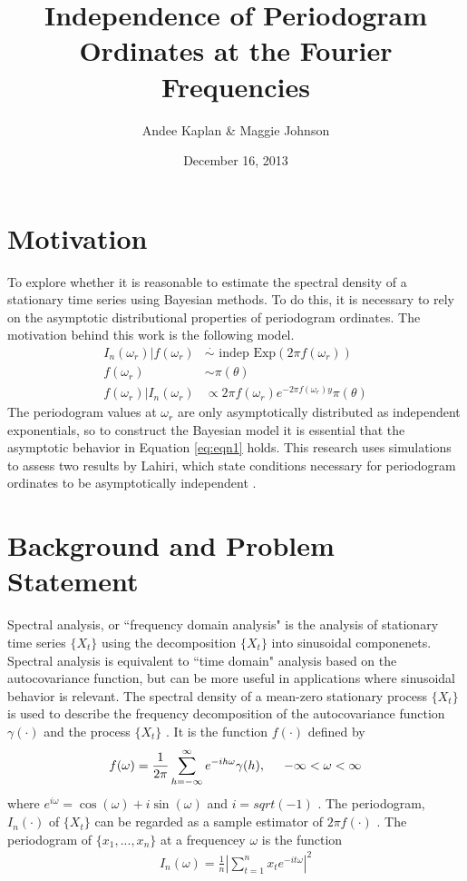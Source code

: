 \documentclass{article}\usepackage[]{graphicx}\usepackage[]{color}
\title{Independence of Periodogram Ordinates at the Fourier Frequencies}
\author{Andee Kaplan \& Maggie Johnson}
\date{December 16, 2013}
\theoremstyle{plain}
\begin{document}
\maketitle



\section{Motivation}

To explore whether it is reasonable to estimate the spectral density of a stationary time series using Bayesian methods. To do this, it is necessary to rely on the asymptotic distributional properties of periodogram ordinates. The motivation behind this work is the following model.
\begin{align}
\label{eq:eqn1}
I_n(\omega_r) |f(\omega_r) &\stackrel{\cdot}{\sim}\text{ indep } \text{Exp}(2\pi f(\omega_r)) \\
\label{eq:eqn2}
f(\omega_r) & \sim \pi(\theta)\\
\label{eq:eqn3}
f(\omega_r) | I_n(\omega_r) &\propto 2\pi f(\omega_r) e^{-2\pi f(\omega_r) y} \pi(\theta)
\end{align}
The periodogram values at $\omega_r$ are only asymptotically distributed as independent exponentials, so to construct the Bayesian model it is essential that the asymptotic behavior in Equation \ref{eq:eqn1} holds. This research uses simulations to assess two results by Lahiri, which state conditions necessary for periodogram ordinates to be asymptotically independent \cite{lahiri2003necessary}.


\section{Background and Problem Statement}

Spectral analysis, or ``frequency domain analysis" is the analysis of stationary time series $\{X_t\}$ using the decomposition $\{X_t\}$ into sinusoidal componenets. Spectral analysis is equivalent to ``time domain" analysis based on the autocovariance function, but can be more useful in applications where sinusoidal behavior is relevant. The spectral density of a mean-zero stationary process $\{X_t\}$ is used to describe the frequency decomposition of the autocovariance function $\gamma(\cdot)$ and the process $\{X_t\}$ \cite{brockwell2002introduction}. It is the function $f(\cdot)$ defined by 
\begin{align}
f(\omega) = \frac{1}{2\pi} \sum_{h=-\infty}^{\infty} e^{-ih\omega} \gamma(h), \hspace{.5cm} -\infty < \omega < \infty
\end{align}
where $e^{i\omega}=\cos(\omega)+i\sin(\omega)$ and $i=sqrt(-1)$ \cite{brockwell2002introduction}. The periodogram, $I_n(\cdot)$ of $\{X_t\}$ can be regarded as a sample estimator of $2\pi f(\cdot)$ \cite{brockwell2002introduction}. The periodogram of $\{x_1,...,x_n\}$ at a frequencey $\omega$ is the function
\begin{align}
I_n(\omega) = \frac{1}{n} \left\lvert \sum_{t=1}^n x_t e^{-it\omega} \right\rvert^2
\end{align}
\end{document}
